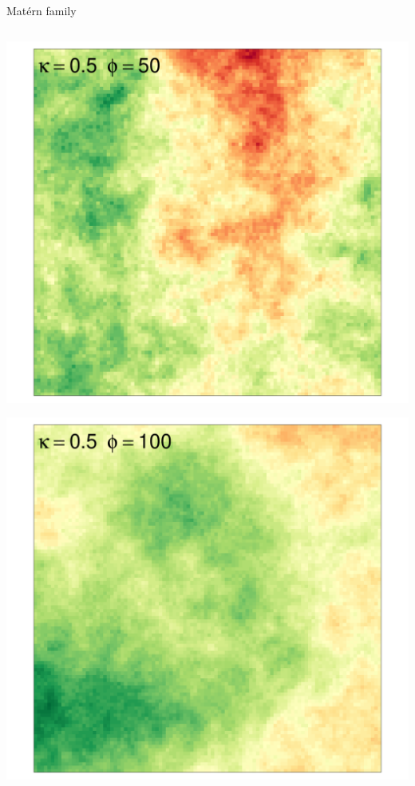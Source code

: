 \documentclass[
  ignorenonframetext,
]{beamer}
\begin{document}
\begin{frame}{Matérn family}
\begin{columns}[T]
\begin{column}{0.33\textwidth}
\includegraphics{Lecture_1_files/figure-beamer/unnamed-chunk-31-1.pdf}

\includegraphics{Lecture_1_files/figure-beamer/unnamed-chunk-32-1.pdf}
\end{column}
\end{columns}
\end{frame}
\end{document}
